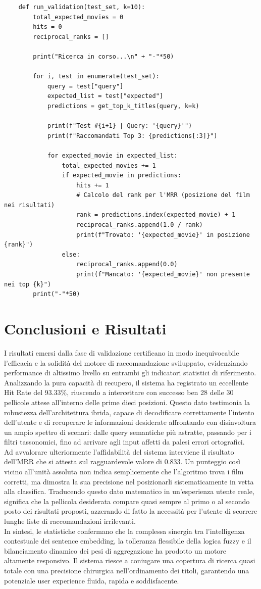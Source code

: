 \documentclass{article}
\begin{document}
\begin{lstlisting}
	def run_validation(test_set, k=10):
		total_expected_movies = 0
		hits = 0
		reciprocal_ranks = []
		
		print("Ricerca in corso...\n" + "-"*50)
		
		for i, test in enumerate(test_set):
			query = test["query"]
			expected_list = test["expected"]
			predictions = get_top_k_titles(query, k=k)
			
			print(f"Test #{i+1} | Query: '{query}'")
			print(f"Raccomandati Top 3: {predictions[:3]}")
		
			for expected_movie in expected_list:
				total_expected_movies += 1
				if expected_movie in predictions:
					hits += 1
					# Calcolo del rank per l'MRR (posizione del film nei risultati)
					rank = predictions.index(expected_movie) + 1
					reciprocal_ranks.append(1.0 / rank)
					print(f"Trovato: '{expected_movie}' in posizione {rank}")
				else:
					reciprocal_ranks.append(0.0)
					print(f"Mancato: '{expected_movie}' non presente nei top {k}")
		print("-"*50)
\end{lstlisting}
\section{Conclusioni e Risultati}
I risultati emersi dalla fase di validazione certificano in modo inequivocabile l'efficacia e la solidit\`a del motore di raccomandazione sviluppato, evidenziando performance di altissimo livello su entrambi gli indicatori statistici di riferimento.\\
Analizzando la pura capacit\`a di recupero, il sistema ha registrato un eccellente Hit Rate del 93.33\%, riuscendo a intercettare con successo ben 28 delle 30 pellicole attese all'interno delle prime dieci posizioni. Questo dato testimonia la robustezza dell'architettura ibrida, capace di decodificare correttamente l'intento dell'utente e di recuperare le informazioni desiderate affrontando con disinvoltura un ampio spettro di scenari: dalle query semantiche pi\`u astratte, passando per i filtri tassonomici, fino ad arrivare agli input affetti da palesi errori ortografici.\\
Ad avvalorare ulteriormente l'affidabilit\`a del sistema interviene il risultato dell'MRR che si attesta sul ragguardevole valore di 0.833. Un punteggio cos\`i vicino all'unit\`a assoluta non indica semplicemente che l'algoritmo trova i film corretti, ma dimostra la sua precisione nel posizionarli sistematicamente in vetta alla classifica. Traducendo questo dato matematico in un'esperienza utente reale, significa che la pellicola desiderata compare quasi sempre al primo o al secondo posto dei risultati proposti, azzerando di fatto la necessit\`a per l'utente di scorrere lunghe liste di raccomandazioni irrilevanti.\\
In sintesi, le statistiche confermano che la complessa sinergia tra l'intelligenza contestuale dei sentence embedding, la tolleranza flessibile della logica fuzzy e il bilanciamento dinamico dei pesi di aggregazione ha prodotto un motore altamente responsivo. Il sistema riesce a coniugare una copertura di ricerca quasi totale con una precisione chirurgica nell'ordinamento dei titoli, garantendo una potenziale user experience fluida, rapida e soddisfacente.
\end{document}
